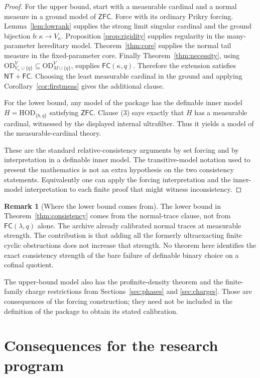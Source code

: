 \documentclass[11pt,letterpaper]{article}
\theoremstyle{definition}
\newtheorem{remark}[definition]{Remark}
\numberwithin{equation}{section}
\newcommand{\ZFC}{\mathsf{ZFC}}
\newcommand{\HOD}{\mathrm{HOD}}
\newcommand{\OD}{\mathrm{OD}}
\newcommand{\ODg}{\OD_{M\cup\{q\}}^{V}}
\newcommand{\ODlow}{\OD_{V_\kappa\cup\{q\}}^{V}}
\newcommand{\Inv}{\mathsf{FC}}
\newcommand{\NTFC}{\mathsf{NT+FC}}
\begin{document}
\begin{proof}
For the upper bound, start with a measurable cardinal and a normal measure
in a ground model of $\ZFC$. Force with its ordinary Prikry forcing.
Lemma~\ref{lem:lowrank} supplies the strong limit singular cardinal and
the ground bijection $b:\kappa\to V_\kappa$. Proposition
\ref{prop:rigidity} supplies regularity in the many-parameter hereditary
model. Theorem~\ref{thm:core} supplies the normal tail measure in the
fixed-parameter core. Finally Theorem~\ref{thm:necessity}, using
$\ODlow\subseteq\ODg$, supplies $\Inv(\kappa,q)$. Therefore the extension
satisfies $\NTFC$. Choosing the least measurable cardinal in the ground
and applying Corollary~\ref{cor:firstmeas} gives the additional clause.

For the lower bound, any model of the package has the definable inner
model $H=\HOD_{\{b,q\}}$ satisfying $\ZFC$. Clause (3) says exactly that
$H$ has a measurable cardinal, witnessed by the displayed internal
ultrafilter. Thus it yields a model of the measurable-cardinal theory.

These are the standard relative-consistency arguments by set forcing and
by interpretation in a definable inner model. The transitive-model
notation used to present the mathematics is not an extra hypothesis on
the two consistency statements. Equivalently one can apply the forcing
interpretation and the inner-model interpretation to each finite proof
that might witness inconsistency.
\end{proof}

\begin{remark}[Where the lower bound comes from]\label{rem:lowerbound}
The lower bound in Theorem~\ref{thm:consistency} comes from the normal-trace
clause, not from $\Inv(\lambda,q)$ alone. The archive already calibrated
normal traces at measurable strength. The contribution is that adding all
the formerly ultraexacting finite cyclic obstructions does not increase
that strength. No theorem here identifies the exact consistency strength
of the bare failure of definable binary choice on a cofinal quotient.
\end{remark}

The upper-bound model also has the profinite-density theorem and the
finite-family charge restrictions from Sections~\ref{sec:phases} and
\ref{sec:charges}. Those are consequences of the forcing construction;
they need not be included in the definition of the package to obtain its
stated calibration.

\section{Consequences for the research program}\label{sec:conclusions}
\end{document}
